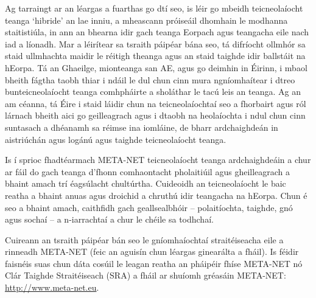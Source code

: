 \begin{multicols}{2}

Ag tarraingt ar an léargas a fuarthas go dtí seo, is léir go mbeidh teicneolaíocht teanga ‘hibride’ an lae inniu, a mheascann próiseáil dhomhain le modhanna staitistiúla, in ann an bhearna idir gach teanga Eorpach agus teangacha eile nach iad a líonadh. Mar a léirítear sa tsraith páipéar bána seo, tá difríocht ollmhór sa staid ullmhachta maidir le réitigh theanga agus an staid taighde idir ballstáit na hEorpa. Tá an Ghaeilge, mionteanga san AE, agus go deimhin in Éirinn, i mbaol bheith fágtha taobh thiar i ndáil le dul chun cinn mura ngníomhaítear i dtreo bunteicneolaíocht teanga comhpháirte a sholáthar le tacú leis an teanga. Ag an am céanna, tá Éire i staid láidir chun na teicneolaíochtaí seo a fhorbairt agus ról lárnach bheith aici go geilleagrach agus i dtaobh na heolaíochta i ndul chun cinn suntasach a dhéanamh sa réimse ina iomláine, de bharr ardchaighdeán in aistriúchán agus logánú agus taighde teicneolaíocht teanga. 

Is í sprioc fhadtéarmach META-NET teicneolaíocht teanga ardchaighdeáin a chur ar fáil do gach teanga d’fhonn comhaontacht pholaitiúil agus gheilleagrach a bhaint amach trí éagsúlacht chultúrtha. Cuideoidh an teicneolaíocht le baic reatha a bhaint anuas agus droichid a chruthú idir teangacha na hEorpa. Chun é seo a bhaint amach, caithfidh gach geallsealbhóir – polaitíochta, taighde, gnó agus sochaí – a n-iarrachtaí a chur le chéile sa todhchaí.

Cuireann an tsraith páipéar bán seo le gníomhaíochtaí straitéiseacha eile a rinneadh META-NET (feic an aguisín chun léargas ginearálta a fháil). Is féidir faisnéis suas chun dáta cosúil le leagan reatha an pháipéir fhíse META-NET \cite{Meta1} nó Clár Taighde Straitéiseach (SRA) a fháil ar shuíomh gréasáin META-NET:  \url{http://www.meta-net.eu}.

\end{multicols}

\clearpage



